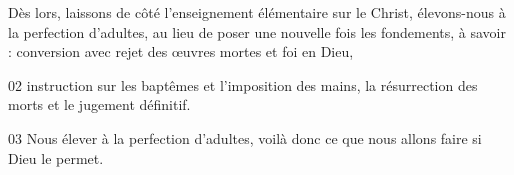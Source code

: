 Dès lors, laissons de côté l’enseignement élémentaire sur le Christ, élevons-nous à la perfection d’adultes, au lieu de poser une nouvelle fois les fondements, à savoir : conversion avec rejet des œuvres mortes et foi en Dieu,

02 instruction sur les baptêmes et l’imposition des mains, la résurrection des morts et le jugement définitif.

03 Nous élever à la perfection d’adultes, voilà donc ce que nous allons faire si Dieu le permet.
